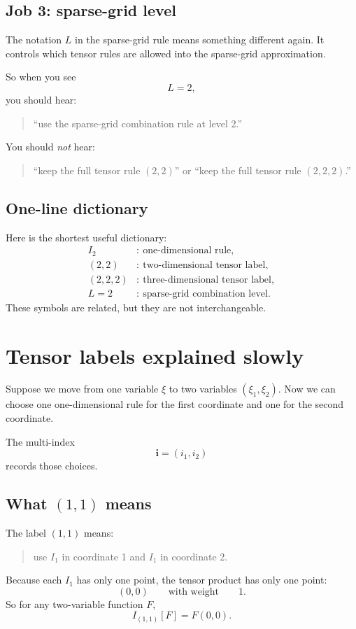 \documentclass[11pt]{article}
\begin{document}
\subsection{Job 3: sparse-grid level}

The notation \(L\) in the sparse-grid rule means something different again.  It
controls which tensor rules are allowed into the sparse-grid approximation.

So when you see
\[
  L=2,
\]
you should hear:
\begin{quote}
``use the sparse-grid combination rule at level 2.''
\end{quote}
You should \emph{not} hear:
\begin{quote}
``keep the full tensor rule \((2,2)\)'' or ``keep the full tensor rule
\((2,2,2)\).''
\end{quote}

\subsection{One-line dictionary}

Here is the shortest useful dictionary:
\begin{align*}
  I_2 &:\ \text{one-dimensional rule},\\
  (2,2) &:\ \text{two-dimensional tensor label},\\
  (2,2,2) &:\ \text{three-dimensional tensor label},\\
  L=2 &:\ \text{sparse-grid combination level}.
\end{align*}
These symbols are related, but they are not interchangeable.

\section{Tensor labels explained slowly}
\label{sec:tensor-labels}

Suppose we move from one variable \(\xi\) to two variables \((\xi_1,\xi_2)\).
Now we can choose one one-dimensional rule for the first coordinate and one for
the second coordinate.

The multi-index
\[
  \mathbf i=(i_1,i_2)
\]
records those choices.

\subsection{What \texorpdfstring{\((1,1)\)}{(1,1)} means}

The label \((1,1)\) means:
\begin{quote}
use \(I_1\) in coordinate 1 and \(I_1\) in coordinate 2.
\end{quote}
Because each \(I_1\) has only one point, the tensor product has only one point:
\begin{equation}
  (0,0)
  \qquad\text{with weight}\qquad 1.
  \label{eq:tensor-11}
\end{equation}
So for any two-variable function \(F\),
\begin{equation}
  I_{(1,1)}[F]=F(0,0).
  \label{eq:I11-of-F}
\end{equation}
\end{document}
